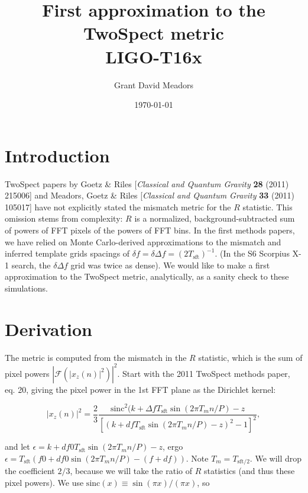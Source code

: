 \documentclass{article}
\begin{document}
\title{First approximation to the TwoSpect metric \\ 
LIGO-T16x}
\author{Grant David Meadors}
\date{\today}

\maketitle

\section{Introduction}

TwoSpect papers by Goetz \& Riles [\textit{Classical and Quantum Gravity} \textbf{28} (2011) 215006] and Meadors, Goetz \& Riles [\textit{Classical and Quantum Gravity} \textbf{33} (2011) 105017] have not explicitly stated the mismatch metric for the $R$ statistic.
This omission stems from complexity: $R$ is a normalized, background-subtracted sum of powers of FFT pixels of the powers of FFT bins.
In the first methods papers, we have relied on Monte Carlo-derived approximations to the mismatch and inferred template grids spacings of $\delta f = \delta \Delta f = (2 T_\mathrm{sft})^{-1}$.
(In the S6 Scorpius X-1 search, the $\delta \Delta f$ grid was twice as dense).
We would like to make a first approximation to the TwoSpect metric, analytically, as a sanity check to these simulations.


\section{Derivation}

The metric is computed from the mismatch in the $R$ statistic, which is the sum of pixel powers $|\mathcal{F}(|x_z (n)|^2)|^2$.
Start with the 2011 TwoSpect methods paper, eq. 20, giving the pixel power in the 1st FFT plane as the Dirichlet kernel:

\begin{equation}
|x_z (n)|^2 = \frac{2}{3} \frac{\mathrm{sinc}^2 (k+ \Delta f T_\mathrm{sft} \sin (2 \pi T_m n / P)-z}{[(k+df T_\mathrm{sft}
              \sin (2 \pi T_m n / P) -z)^2 -1]^2},
\end{equation}

\noindent and let $\epsilon = k+ df0 T_\mathrm{sft} \sin(2\pi T_m n / P)-z$,
ergo $\epsilon = T_\mathrm{sft}(f0+ df0 \sin(2\pi T_m n /P) - (f+df) )$.
Note $T_m = T_\mathrm{sft/2}$. 
We will drop the coefficient $2/3$, because we will take the ratio of $R$ statistics (and thus these pixel powers).
We use $\mathrm{sinc}(x) \equiv \sin(\pi x)/(\pi x)$,
so
\end{document}
